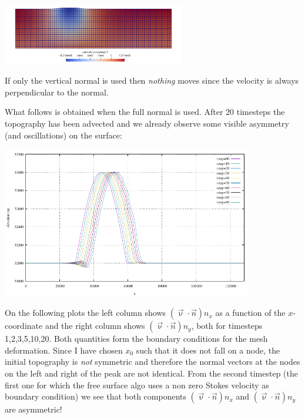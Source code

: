 \begin{center}
\includegraphics[width=8cm]{python_codes/fieldstone_54/images/exp7/v}
\end{center}

If only the vertical normal is used then {\sl nothing} moves since the 
velocity is always perpendicular to the normal. 

What follows is obtained when the full normal is used. 
After 20 timesteps the topography has been advected and we already observe some 
visible asymmetry (and oscillations) on the surface:
\begin{center}
\includegraphics[width=11cm]{python_codes/fieldstone_54/images/exp7/surface.pdf}
\end{center}

On the following plots the left column shows $(\vec{\upnu}\cdot \vec{n})n_x$ 
as a function of the $x$-coordinate and the 
right column shows $(\vec{\upnu}\cdot \vec{n})n_y$, both for timesteps 1,2,3,5,10,20. 
Both quantities form the 
boundary conditions for the mesh deformation.  
Since I have chosen $x_0$ such that it does not fall on a node, the initial 
topography is {\sl not} symmetric and therefore the normal vectors at the nodes 
on the left and right of the peak are not identical. From the second timestep (the first one 
for which the free surface algo uses a non zero Stokes velocity as boundary condition)
we see that both components $(\vec{\upnu}\cdot \vec{n})n_x$ and $(\vec{\upnu}\cdot \vec{n})n_y$ are asymmetric! 



